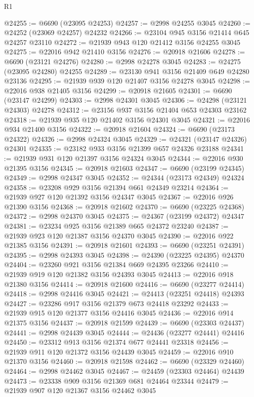\begin{lexlean}{R1}
\begin{coremodule}
@24255 := @6690 (@23095 @24253)
@24257 := @2998 @24255 @3045
@24260 := @24252 (@23069 @24257) @24232
@24266 := @23104 @945 @3156 @21414 @645 @24257 @23110
@24272 := @21939 @943 @120 @21412 @3156 @24255 @3045
@24275 := @22016 @942 @21410 @3156
@24276 := @20918 @21606
@24278 := @6690 (@23121 @24276)
@24280 := @2998 @24278 @3045
@24283 := @24275 (@23095 @24280) @24255
@24289 := @23130 @941 @3156 @21409 @649 @24280 @23136
@24295 := @21939 @939 @120 @21407 @3156 @24278 @3045
@24298 := @22016 @938 @21405 @3156
@24299 := @20918 @21605
@24301 := @6690 (@23147 @24299)
@24303 := @2998 @24301 @3045
@24306 := @24298 (@23121 @24303) @24278
@24312 := @23156 @937 @3156 @21404 @653 @24303 @23162
@24318 := @21939 @935 @120 @21402 @3156 @24301 @3045
@24321 := @22016 @934 @21400 @3156
@24322 := @20918 @21604
@24324 := @6690 (@23173 @24322)
@24326 := @2998 @24324 @3045
@24329 := @24321 (@23147 @24326) @24301
@24335 := @23182 @933 @3156 @21399 @657 @24326 @23188
@24341 := @21939 @931 @120 @21397 @3156 @24324 @3045
@24344 := @22016 @930 @21395 @3156
@24345 := @20918 @21603
@24347 := @6690 (@23199 @24345)
@24349 := @2998 @24347 @3045
@24352 := @24344 (@23173 @24349) @24324
@24358 := @23208 @929 @3156 @21394 @661 @24349 @23214
@24364 := @21939 @927 @120 @21392 @3156 @24347 @3045
@24367 := @22016 @926 @21390 @3156
@24368 := @20918 @21602
@24370 := @6690 (@23225 @24368)
@24372 := @2998 @24370 @3045
@24375 := @24367 (@23199 @24372) @24347
@24381 := @23234 @925 @3156 @21389 @665 @24372 @23240
@24387 := @21939 @923 @120 @21387 @3156 @24370 @3045
@24390 := @22016 @922 @21385 @3156
@24391 := @20918 @21601
@24393 := @6690 (@23251 @24391)
@24395 := @2998 @24393 @3045
@24398 := @24390 (@23225 @24395) @24370
@24404 := @23260 @921 @3156 @21384 @669 @24395 @23266
@24410 := @21939 @919 @120 @21382 @3156 @24393 @3045
@24413 := @22016 @918 @21380 @3156
@24414 := @20918 @21600
@24416 := @6690 (@23277 @24414)
@24418 := @2998 @24416 @3045
@24421 := @24413 (@23251 @24418) @24393
@24427 := @23286 @917 @3156 @21379 @673 @24418 @23292
@24433 := @21939 @915 @120 @21377 @3156 @24416 @3045
@24436 := @22016 @914 @21375 @3156
@24437 := @20918 @21599
@24439 := @6690 (@23303 @24437)
@24441 := @2998 @24439 @3045
@24444 := @24436 (@23277 @24441) @24416
@24450 := @23312 @913 @3156 @21374 @677 @24441 @23318
@24456 := @21939 @911 @120 @21372 @3156 @24439 @3045
@24459 := @22016 @910 @21370 @3156
@24460 := @20918 @21598
@24462 := @6690 (@23329 @24460)
@24464 := @2998 @24462 @3045
@24467 := @24459 (@23303 @24464) @24439
@24473 := @23338 @909 @3156 @21369 @681 @24464 @23344
@24479 := @21939 @907 @120 @21367 @3156 @24462 @3045

\end{coremodule}
\end{lexlean}
